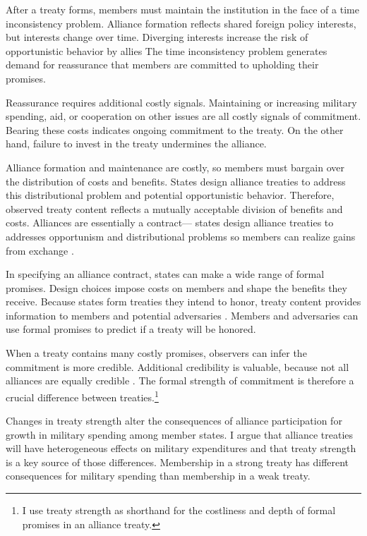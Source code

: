 \documentclass[12pt]{article}
\begin{document}
After a treaty forms, members must maintain the institution in the face of a time inconsistency problem. 
Alliance formation reflects shared foreign policy interests, but interests change over time. 
Diverging interests increase the risk of opportunistic behavior by allies \citep{Leeds2003a, LeedsSavun2007}
The time inconsistency problem generates demand for reassurance that members are committed to upholding their promises. 


Reassurance requires additional costly signals. 
Maintaining or increasing military spending, aid, or cooperation on other issues are all costly signals of commitment. 
Bearing these costs indicates ongoing commitment to the treaty. 
On the other hand, failure to invest in the treaty undermines the alliance. 


Alliance formation and maintenance are costly, so members must bargain over the distribution of costs and benefits.
States design alliance treaties to address this distributional problem and potential opportunistic behavior. 
Therefore, observed treaty content reflects a mutually acceptable division of benefits and costs. 
Alliances are essentially a contract--- states design alliance treaties to addresses opportunism and distributional problems \citep{Williamson1985, Koremenosetal2001} so members can realize gains from exchange \citep{Lake1996, Bensonetal2014}.


In specifying an alliance contract, states can make a wide range of formal promises. 
Design choices impose costs on members and shape the benefits they receive.
Because states form treaties they intend to honor, treaty content provides information to members and potential adversaries \citep{Leeds2003}. 
Members and adversaries can use formal promises to predict if a treaty will be honored.


When a treaty contains many costly promises, observers can infer the commitment is more credible. 
Additional credibility is valuable, because not all alliances are equally credible \citep{Benson2012}. 
The formal strength of commitment is therefore a crucial difference between treaties.\footnote{I use treaty strength as shorthand for the costliness and depth of formal promises in an alliance treaty.} 


Changes in treaty strength alter the consequences of alliance participation for growth in military spending among member states. 
I argue that alliance treaties will have heterogeneous effects on military expenditures and that treaty strength is a key source of those differences. 
Membership in a strong treaty has different consequences for military spending than membership in a weak treaty. 
\end{document}
